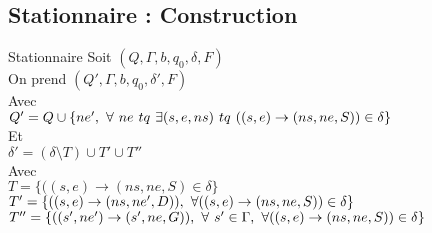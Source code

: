 \documentclass[12pt]{beamer}
\begin{document}
\subsection{Stationnaire : Construction}
\begin{frame}{Stationnaire}
    Soit $(Q, \Gamma, b, q_0, \delta, F)$\\
    On prend $(Q', \Gamma, b, q_0, \delta', F)$\\
    Avec\\
    \mbox{$Q' = Q \cup \{ne',\hspace{0.125cm}\forall \hspace{0.125cm} ne \hspace{0.125cm} tq \hspace{0.125cm} \exists (s,e,ns) \hspace{0.125cm} tq  \hspace{0.125cm} ((s,e)\rightarrow(ns,ne,S)) \in \delta\} $} \\
    Et\\
    $\delta'  = (\delta\setminus T) \cup T' \cup T''$ \\
    Avec\\
    $T = \{((s,e)\rightarrow(ns,ne,S) \in \delta \}$ \\
    $T' = \{((s,e)\rightarrow(ns,ne',D)),\hspace{0.125cm}\forall  ((s,e)\rightarrow(ns,ne,S)) \in \delta\} $\\
    $T'' = \{((s',ne')\rightarrow(s',ne,G)),\hspace{0.125cm}\forall \hspace{0.125cm} s' \in \Gamma, \hspace{0.125cm} \forall((s,e)\rightarrow(ns,ne,S)) \in \delta\}$\\
    
    
\end{frame}
\end{document}
